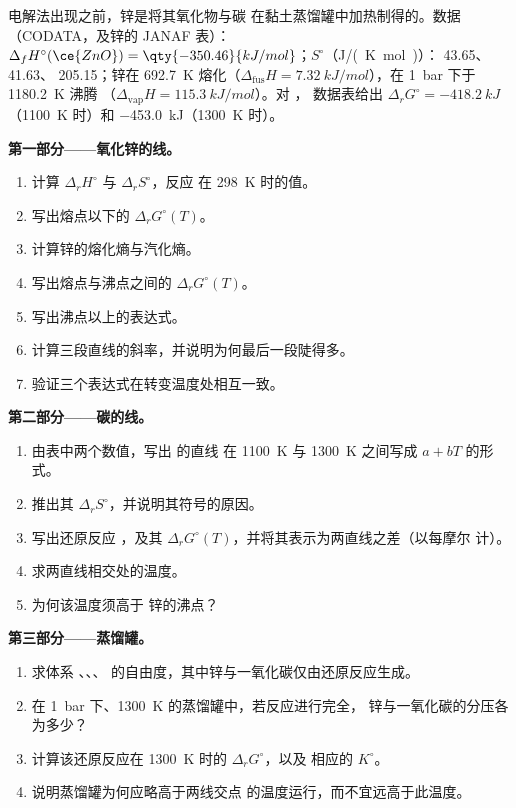 \begin{problem}
\label{pb:b2:ellingham:1}
电解法出现之前，锌是将其氧化物与碳
在黏土蒸馏罐中加热制得的。数据（CODATA，及锌的 JANAF 表）：$\Delta_f H^\circ(\ce{ZnO})
= \qty{-350.46}{kJ/mol}$；$S^\circ$（\unit{J/(K.mol)}）： 43.65、
41.63、 205.15；锌在 \qty{692.7}{K} 熔化（$\Delta_{\text{fus}}H =
\qty{7.32}{kJ/mol}$），在 \qty{1}{bar} 下于 \qty{1180.2}{K} 沸腾
（$\Delta_{\text{vap}}H = \qty{115.3}{kJ/mol}$）。对 ，
数据表给出 $\Delta_r G^\circ = \qty{-418.2}{kJ}$（\qty{1100}{K} 时）和
\qty{-453.0}{kJ}（\qty{1300}{K} 时）。

\medskip
\noindent\textbf{第一部分——氧化锌的线。}
\begin{enumerate}
  \item 计算 $\Delta_r H^\circ$ 与 $\Delta_r S^\circ$，反应  在 \qty{298}{K} 时的值。
  \item 写出熔点以下的 $\Delta_r G^\circ(T)$。
  \item 计算锌的熔化熵与汽化熵。
  \item 写出熔点与沸点之间的 $\Delta_r G^\circ(T)$。
  \item 写出沸点以上的表达式。
  \item 计算三段直线的斜率，并说明为何最后一段陡得多。
  \item 验证三个表达式在转变温度处相互一致。
\end{enumerate}

\medskip
\noindent\textbf{第二部分——碳的线。}
\begin{enumerate}[resume]
  \item 由表中两个数值，写出  的直线
        在 \qty{1100}{K} 与 \qty{1300}{K} 之间写成 $a + bT$ 的形式。
  \item 推出其 $\Delta_r S^\circ$，并说明其符号的原因。
  \item 写出还原反应 ，及其 $\Delta_r
        G^\circ(T)$，并将其表示为两直线之差（以每摩尔  计）。
  \item 求两直线相交处的温度。
  \item 为何该温度须高于
        锌的沸点？
\end{enumerate}

\medskip
\noindent\textbf{第三部分——蒸馏罐。}
\begin{enumerate}[resume]
  \item 求体系 、、、
         的自由度，其中锌与一氧化碳仅由还原反应生成。
  \item 在 \qty{1}{bar} 下、\qty{1300}{K} 的蒸馏罐中，若反应进行完全，
        锌与一氧化碳的分压各为多少？
  \item 计算该还原反应在 \qty{1300}{K} 时的 $\Delta_r G^\circ$，以及
        相应的 $K^\circ$。
  \item 说明蒸馏罐为何应略高于两线交点
        的温度运行，而不宜远高于此温度。
\end{enumerate}


\end{problem}

